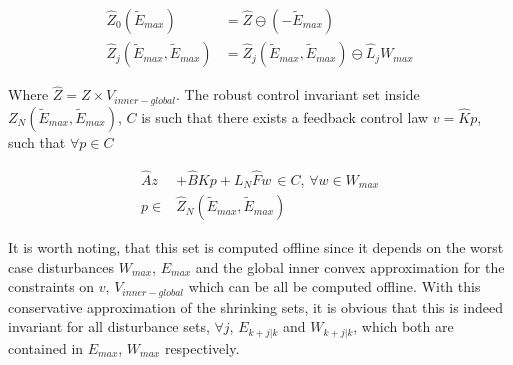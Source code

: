\begin{subequations}
\begin{align}
\hat{Z}_0(\tilde{E}_{max}) &=\hat{Z}\ominus(-\tilde{E}_{max}) \\
\hat{Z}_j(\tilde{E}_{max},\tilde{E}_{max}) &= \hat{Z}_j(\tilde{E}_{max},\tilde{E}_{max})\ominus \hat{L}_{j}W_{max}
\end{align}
\end{subequations}

Where $\hat{Z}=Z\times V_{inner-global}$. The robust control invariant set inside $Z_N(\tilde{E}_{max},\tilde{E}_{max})$, $C$ is such that there exists a feedback control law $v=\hat{K}p$, such that $\forall p\in C$


\begin{subequations}
\begin{align}
\hat{A}z &+ \hat{B}Kp+L_N \hat{F}w \, \in C,\, \forall w \in W_{max} \\
p \in &\hat{Z}_N(\tilde{E}_{max}, \tilde{E}_{max})
\end{align}
\end{subequations}

It is worth noting, that this set is computed offline since it depends on the worst case disturbances $W_{max}$, $E_{max}$ and the global inner convex approximation for the constraints on $v$, $V_{inner-global}$ which can be all be computed offline. With this conservative approximation of the shrinking sets, it is obvious that this is indeed invariant for all disturbance sets, $\forall j$, $E_{k+j|k}$ and $W_{k+j|k}$, which both are contained in $E_{max}$, $W_{max}$ respectively. 


